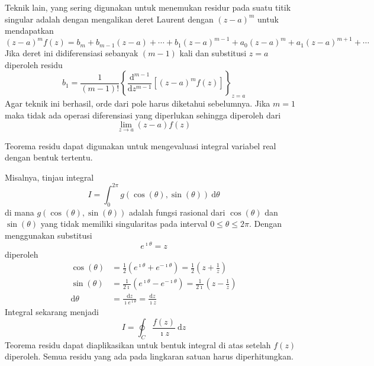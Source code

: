 Teknik lain, yang sering digunakan untuk menemukan residur pada suatu
titik singular adalah dengan mengalikan deret Laurent dengan $(z-a)^{m}$
untuk mendapatkan
\begin{equation*}
(z-a)^{m}f(z) = b_{m} + b_{m-1}(z-a) + \cdots + b_{1}(z-a)^{m-1} +
a_{0}(z-a)^{m} + a_{1}(z-a)^{m+1} + \cdots
\end{equation*}
Jika deret ini didiferensiasi sebanyak $(m-1)$ kali dan substitusi
$z=a$ diperoleh residu
\begin{equation*}
b_{1}=\frac{1}{(m-1)!}\left\{ \frac{\mathrm{d}^{m-1}}{\mathrm{d}z^{m-1}}\left[(z-a)^{m}f(z)\right]\right\} _{z=a}
\end{equation*}
Agar teknik ini berhasil, orde dari pole harus diketahui sebelumnya.
Jika $m=1$ maka tidak ada operasi diferensiasi yang diperlukan sehingga
diperoleh dari
\[
\lim_{z\rightarrow a}(z-a)f(z)
\]

Teorema residu dapat digunakan untuk mengevaluasi integral variabel
real dengan bentuk tertentu.

Misalnya, tinjau integral
\begin{equation*}
I = \int_{0}^{2\pi}g(\cos(\theta),\sin(\theta))\ \mathrm{d}\theta
\end{equation*}
di mana $g(\cos(\theta),\sin(\theta))$ adalah fungsi rasional dari
$\cos(\theta)$ dan $\sin(\theta)$ yang tidak memiliki singularitas
pada interval $0\leq\theta\leq2\pi$. Dengan menggunakan substitusi
\[
e^{\imath\theta}=z
\]
diperoleh
\begin{align*}
\cos(\theta) & =\frac{1}{2}\left(e^{\imath\theta}+e^{-\imath\theta}\right)=\frac{1}{2}\left(z+\frac{1}{z}\right)\\
\sin(\theta) & =\frac{1}{2\imath}\left(e^{\imath\theta}-e^{-\imath\theta}\right)=\frac{1}{2\imath}\left(z-\frac{1}{z}\right)\\
\mathrm{d}\theta & =\frac{\mathrm{d}z}{\imath e^{\imath\theta}}=\frac{\mathrm{d}z}{\imath z}
\end{align*}
Integral sekarang menjadi
\[
I=\oint_{C}\frac{f(z)}{\imath z}\ \mathrm{d}z
\]
Teorema residu dapat diaplikasikan untuk bentuk integral di atas setelah
$f(z)$ diperoleh. Semua residu yang ada pada lingkaran satuan harus
diperhitungkan.

